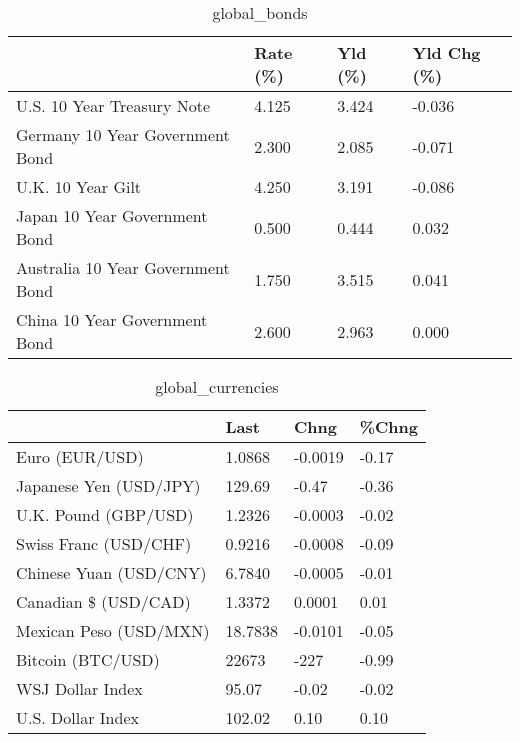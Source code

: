 \documentclass{article}%
\begin{document}
%


\begin{table}[htbp]%
\caption{global\_bonds}%
\centering%
\begin{adjustbox}{width=1\textwidth}%
\begin{tabular}{llll}
\toprule
                                  & Rate (\%) & Yld (\%) & Yld Chg (\%) \\
\midrule
       U.S. 10 Year Treasury Note &    4.125 &   3.424 &      -0.036 \\
  Germany 10 Year Government Bond &    2.300 &   2.085 &      -0.071 \\
                U.K. 10 Year Gilt &    4.250 &   3.191 &      -0.086 \\
    Japan 10 Year Government Bond &    0.500 &   0.444 &       0.032 \\
Australia 10 Year Government Bond &    1.750 &   3.515 &       0.041 \\
    China 10 Year Government Bond &    2.600 &   2.963 &       0.000 \\
\bottomrule
\end{tabular}
%
\end{adjustbox}%
\end{table}

%


\begin{table}[htbp]%
\caption{global\_currencies}%
\centering%
\begin{adjustbox}{width=1\textwidth}%
\begin{tabular}{llll}
\toprule
                       &    Last &    Chng & \%Chng \\
\midrule
        Euro (EUR/USD) &  1.0868 & -0.0019 & -0.17 \\
Japanese Yen (USD/JPY) &  129.69 &   -0.47 & -0.36 \\
  U.K. Pound (GBP/USD) &  1.2326 & -0.0003 & -0.02 \\
 Swiss Franc (USD/CHF) &  0.9216 & -0.0008 & -0.09 \\
Chinese Yuan (USD/CNY) &  6.7840 & -0.0005 & -0.01 \\
  Canadian \$ (USD/CAD) &  1.3372 &  0.0001 &  0.01 \\
Mexican Peso (USD/MXN) & 18.7838 & -0.0101 & -0.05 \\
     Bitcoin (BTC/USD) &   22673 &    -227 & -0.99 \\
      WSJ Dollar Index &   95.07 &   -0.02 & -0.02 \\
     U.S. Dollar Index &  102.02 &    0.10 &  0.10 \\
\bottomrule
\end{tabular}
%
\end{adjustbox}%
\end{table}
\end{document}
